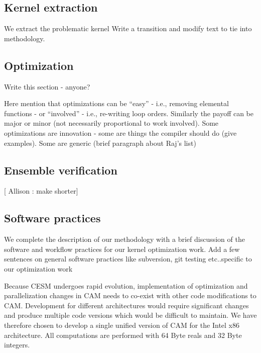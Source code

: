 \subsection{Kernel extraction}

We extract the problematic kernel {\color{red} Write a transition and modify text to tie into methodology}.  



\subsection{Optimization}

 {\color{red} Write this section - anyone?}

Here mention that optimizations can be ``easy'' - i.e., removing elemental functions - or ``involved'' - i.e., re-writing loop orders.  Similarly the payoff can be major or minor (not necessarily proportional to work involved).
Some optimizations are innovation - some are things the compiler should do (give examples).  Some are generic (brief paragraph about Raj's list)


\subsection{Ensemble verification}

[ {\color{red} Allison :} make shorter]




\subsection{Software practices}

We complete the description of our methodology with a brief discussion of the software and workflow practices for our kernel optimization work.
{\color{red} Add a few sentences on general software practices like subversion, git testing etc..specific to our optimization work}
 

Because CESM undergoes rapid evolution, implementation of optimization and parallelization changes in CAM needs to co-exist with other code modifications to CAM. Development for different architectures would require significant changes and produce multiple code versions which would be difficult to maintain. We have therefore chosen to develop a single unified version of CAM for the Intel x86 architecture.  All computations are performed with 64 Byte reals and 32 Byte integers.

